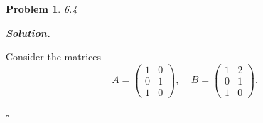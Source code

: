 \documentclass[12pt]{report}
\newtheorem{problem}{Problem}
\newenvironment{solution}[1][\it{Solution}]{\textbf{#1. } }{$\square$}
\begin{document}
\newpage



\begin{problem}
    6.4
\end{problem}

\begin{solution}


    \noindent
    Consider the matrices 
    \[
        A = \begin{pmatrix}
            1&0\\0&1\\1&0
        \end{pmatrix}, ~~~~~ B = \begin{pmatrix}
            1&2\\0&1\\1&0
        \end{pmatrix}.
    \]
    

\end{solution}
\end{document}
